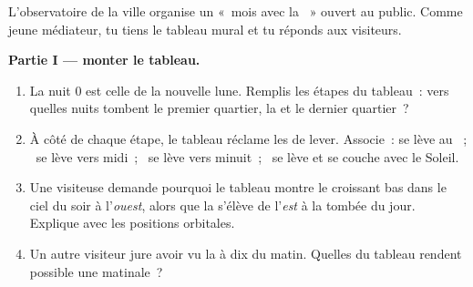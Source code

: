 \begin{problem}\label{pb:g7:moon-phases:1}
L'observatoire de la ville organise un «~mois avec la ~» ouvert
au public. Comme jeune médiateur, tu tiens le tableau mural et tu
réponds aux visiteurs.

\medskip\noindent\textbf{Partie I --- monter le tableau.}
\begin{enumerate}
  \item La nuit 0 est celle de la nouvelle lune. Remplis les
        étapes du tableau~: vers quelles nuits tombent le premier
        quartier, la  et le dernier quartier~?
  \item À côté de chaque étape, le tableau réclame les  de
        lever. Associe~: se lève au ~; \ se lève
        vers midi~; \ se lève vers minuit~; \ se lève et se couche
        avec le Soleil.
  \item Une visiteuse demande pourquoi le tableau montre le
        croissant bas dans le ciel du soir à l'\emph{ouest}, alors
        que la  s'élève de l'\emph{est} à la tombée du
        jour. Explique avec les positions orbitales.
  \item Un autre visiteur jure avoir vu la  à dix  du
        matin. Quelles  du tableau rendent possible une 
        matinale~?
\end{enumerate}


\end{problem}
